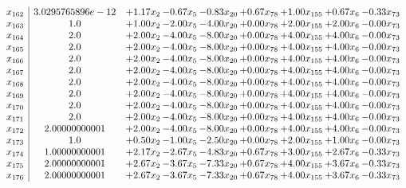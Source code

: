 \documentclass[8pt]{article}
\begin{document}
\[\begin{array}{c| c c@{\hskip 2pt} c@{\hskip 2pt} c@{\hskip 2pt} c@{\hskip 2pt} c@{\hskip 2pt} c@{\hskip 2pt} c@{\hskip 2pt} }
 x_{162}   &  3.0295765896e-12 & +  1.17 x_{2} & -0.67 x_{5} & -0.83 x_{20} & +  0.67 x_{78} & +  1.00 x_{155} & +  0.67 x_{6} & -0.33 x_{73}\\
 x_{163}   &  1.0 & +  1.00 x_{2} & -2.00 x_{5} & -4.00 x_{20} & +  0.00 x_{78} & +  2.00 x_{155} & +  2.00 x_{6} & -0.00 x_{73}\\
 x_{164}   &  2.0 & +  2.00 x_{2} & -4.00 x_{5} & -8.00 x_{20} & +  0.00 x_{78} & +  4.00 x_{155} & +  4.00 x_{6} & -0.00 x_{73}\\
 x_{165}   &  2.0 & +  2.00 x_{2} & -4.00 x_{5} & -8.00 x_{20} & +  0.00 x_{78} & +  4.00 x_{155} & +  4.00 x_{6} & -0.00 x_{73}\\
 x_{166}   &  2.0 & +  2.00 x_{2} & -4.00 x_{5} & -8.00 x_{20} & +  0.00 x_{78} & +  4.00 x_{155} & +  4.00 x_{6} & -0.00 x_{73}\\
 x_{167}   &  2.0 & +  2.00 x_{2} & -4.00 x_{5} & -8.00 x_{20} & +  0.00 x_{78} & +  4.00 x_{155} & +  4.00 x_{6} & -0.00 x_{73}\\
 x_{168}   &  2.0 & +  2.00 x_{2} & -4.00 x_{5} & -8.00 x_{20} & +  0.00 x_{78} & +  4.00 x_{155} & +  4.00 x_{6} & -0.00 x_{73}\\
 x_{169}   &  2.0 & +  2.00 x_{2} & -4.00 x_{5} & -8.00 x_{20} & +  0.00 x_{78} & +  4.00 x_{155} & +  4.00 x_{6} & -0.00 x_{73}\\
 x_{170}   &  2.0 & +  2.00 x_{2} & -4.00 x_{5} & -8.00 x_{20} & +  0.00 x_{78} & +  4.00 x_{155} & +  4.00 x_{6} & -0.00 x_{73}\\
 x_{171}   &  2.0 & +  2.00 x_{2} & -4.00 x_{5} & -8.00 x_{20} & +  0.00 x_{78} & +  4.00 x_{155} & +  4.00 x_{6} & -0.00 x_{73}\\
 x_{172}   &  2.00000000001 & +  2.00 x_{2} & -4.00 x_{5} & -8.00 x_{20} & +  0.00 x_{78} & +  4.00 x_{155} & +  4.00 x_{6} & -0.00 x_{73}\\
 x_{173}   &  1.0 & +  0.50 x_{2} & -1.00 x_{5} & -2.50 x_{20} & +  0.00 x_{78} & +  2.00 x_{155} & +  1.00 x_{6} & -0.00 x_{73}\\
 x_{174}   &  1.00000000001 & +  2.17 x_{2} & -2.67 x_{5} & -4.83 x_{20} & +  0.67 x_{78} & +  3.00 x_{155} & +  2.67 x_{6} & -0.33 x_{73}\\
 x_{175}   &  2.00000000001 & +  2.67 x_{2} & -3.67 x_{5} & -7.33 x_{20} & +  0.67 x_{78} & +  4.00 x_{155} & +  3.67 x_{6} & -0.33 x_{73}\\
 x_{176}   &  2.00000000001 & +  2.67 x_{2} & -3.67 x_{5} & -7.33 x_{20} & +  0.67 x_{78} & +  4.00 x_{155} & +  3.67 x_{6} & -0.33 x_{73}\\

\end{array}\]
\end{document}
